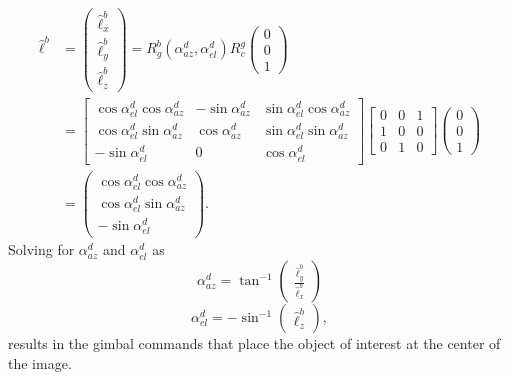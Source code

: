 \begin{align}
\hat{\ell}^b&=\begin{pmatrix}
\hat{\ell}_x^b \\
\hat{\ell}_y^b \\
\hat{\ell}_z^b
\end{pmatrix}=R_{g}^b(\alpha_{az}^d, \alpha_{el}^d) R_{c}^g\begin{pmatrix}
0 \\ 0 \\ 1
\end{pmatrix}
\\&=\begin{bmatrix}
\cos\alpha_{el}^d\cos\alpha_{az}^d & -\sin\alpha_{az}^d & \sin\alpha_{el}^d\cos\alpha_{az}^d \\
\cos\alpha_{el}^d\sin\alpha_{az}^d & \cos\alpha_{az}^d & \sin\alpha_{el}^d\sin\alpha_{az}^d \\
-\sin\alpha_{el}^d & 0 & \cos\alpha_{el}^d
\end{bmatrix}
\begin{bmatrix}
0 & 0 & 1 \\
1 & 0 & 0 \\
0 & 1 & 0
\end{bmatrix}
\begin{pmatrix}
0 \\ 0 \\ 1
\end{pmatrix}
\\&=\begin{pmatrix}
\cos\alpha_{el}^d\cos\alpha_{az}^d \\
\cos\alpha_{el}^d\sin\alpha_{az}^d \\
-\sin\alpha_{el}^d
\end{pmatrix}.
\end{align}
Solving for $\alpha_{az}^d$ and $\alpha_{el}^d$ as 
\begin{equation}
\alpha_{az}^d=\tan^{-1}
\begin{pmatrix}
\frac{\hat{\ell}_y^b}{\hat{\ell}_x^b}
\end{pmatrix}
\end{equation}
\begin{equation}
\alpha_{el}^d=-\sin^{-1}
\begin{pmatrix}
\hat{\ell}_z^b
\end{pmatrix},
\end{equation}
results in the gimbal commands that place the object of interest at the center of the image.

